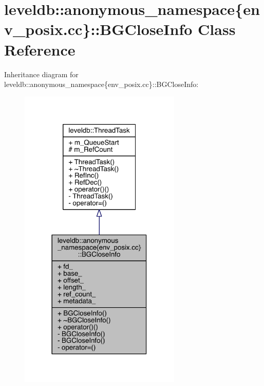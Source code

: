 \hypertarget{classleveldb_1_1anonymous__namespace_02env__posix_8cc_03_1_1_b_g_close_info}{}\section{leveldb\+:\+:anonymous\+\_\+namespace\{env\+\_\+posix.\+cc\}\+:\+:B\+G\+Close\+Info Class Reference}
\label{classleveldb_1_1anonymous__namespace_02env__posix_8cc_03_1_1_b_g_close_info}


Inheritance diagram for leveldb\+:\+:anonymous\+\_\+namespace\{env\+\_\+posix.\+cc\}\+:\+:B\+G\+Close\+Info\+:
\nopagebreak
\begin{figure}[H]
\begin{center}
\leavevmode
\includegraphics[width=218pt]{classleveldb_1_1anonymous__namespace_02env__posix_8cc_03_1_1_b_g_close_info__inherit__graph}
\end{center}
\end{figure}


